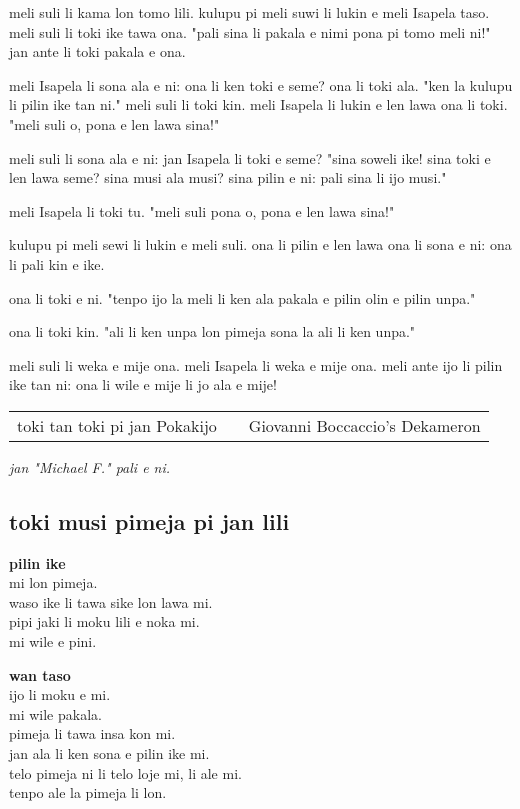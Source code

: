 meli suli li kama lon tomo lili.
kulupu pi meli suwi li lukin e meli Isapela taso.
meli suli li toki ike tawa ona.
"pali sina li pakala e nimi pona pi tomo meli ni!"
jan ante li toki pakala e ona.

meli Isapela li sona ala e ni: ona li ken toki e seme?
ona li toki ala.
"ken la kulupu li pilin ike tan ni."
meli suli li toki kin.
meli Isapela li lukin e len lawa ona li toki.
"meli suli o, pona e len lawa sina!"

meli suli li sona ala e ni: jan Isapela li toki e seme?
"sina soweli ike!
sina toki e len lawa seme?
sina musi ala musi?
sina pilin e ni: pali sina li ijo musi."

meli Isapela li toki tu.
"meli suli pona o, pona e len lawa sina!"

kulupu pi meli sewi li lukin e meli suli.
ona li pilin e len lawa ona li sona e ni: ona li pali kin e ike.

ona li toki e ni.
"tenpo ijo la meli li ken ala pakala e pilin olin e pilin unpa."

ona li toki kin.
"ali li ken unpa lon pimeja sona la ali li ken unpa."

meli suli li weka e mije ona.
meli Isapela li weka e mije ona.
meli ante ijo li pilin ike tan ni: ona li wile e mije li jo ala e mije!

\begin{supertabular}{p{5,5cm}|ll}
toki tan toki pi jan Pokakijo && Giovanni Boccaccio's Dekameron \\
\end{supertabular}

\textit{jan "Michael F." pali e ni. \cite{www:failbluedot:01}}
%
\subsection{toki musi pimeja pi jan lili}

\textbf{pilin ike} \\
mi lon pimeja.  \\
waso ike li tawa sike lon lawa mi.  \\
pipi jaki li moku lili e noka mi.  \\
mi wile e pini.  

\textbf{wan taso} \\
ijo li moku e mi.  \\
mi wile pakala.  \\
pimeja li tawa insa kon mi.  \\
jan ala li ken sona e pilin ike mi.  \\
telo pimeja ni li telo loje mi, li ale mi.  \\
tenpo ale la pimeja li lon. 

